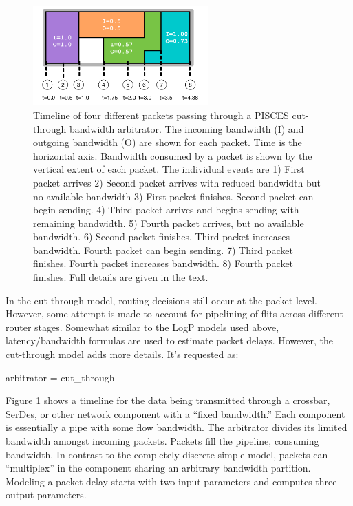 \begin{figure}
\centering
\includegraphics[width=0.6\textwidth]{figures/Pisces.png}
\caption{Timeline of four different packets passing through a PISCES cut-through bandwidth arbitrator. The incoming bandwidth (I) and outgoing bandwidth (O) are shown for each packet.  Time is the horizontal axis. Bandwidth consumed by a packet is shown by the vertical extent of each packet. The individual events are 1) First packet arrives 2) Second packet arrives with reduced bandwidth but no available bandwidth 3) First packet finishes. Second packet can begin sending. 4) Third packet arrives and begins sending with remaining bandwidth. 5) Fourth packet arrives, but no available bandwidth. 6) Second packet finishes. Third packet increases bandwidth. Fourth packet can begin sending. 7) Third packet finishes. Fourth packet increases bandwidth. 8) Fourth packet finishes.
Full details are given in the text.}
\label{fig:pisces}
\end{figure}

In the cut-through model, routing decisions still occur at the packet-level.
However, some attempt is made to account for pipelining of flits across different router stages.
Somewhat similar to the LogP models used above, latency/bandwidth formulas are used to estimate packet delays.
However, the cut-through model adds more details.
It's requested as:

\begin{ViFile}
arbitrator = cut_through
\end{ViFile}
Figure \ref{fig:pisces} shows a timeline for the data being transmitted through a crossbar, SerDes, or other network component with a ``fixed bandwidth.'' 
Each component is essentially a pipe with some flow bandwidth.
The arbitrator divides its limited bandwidth amongst incoming packets.
Packets fill the pipeline, consuming bandwidth.
In contrast to the completely discrete simple model, packets can ``multiplex'' in the component sharing an arbitrary bandwidth partition.
Modeling a packet delay starts with two input parameters and computes three output parameters.

